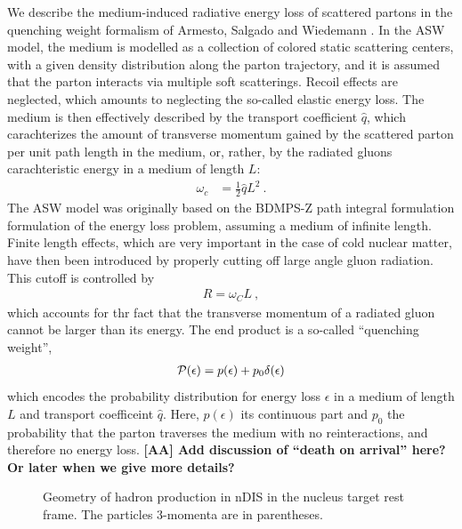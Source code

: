 We describe the medium-induced radiative energy loss of scattered partons in the quenching weight formalism of Armesto, Salgado and Wiedemann \cite{Salgado:2002cd,Salgado:2003gb,Armesto:2003jh}. In the ASW model, the medium is modelled as a collection of colored static scattering centers, with a given density distribution along the parton trajectory, and it is assumed that the parton interacts via multiple soft scatterings. Recoil effects are neglected, which amounts to neglecting the so-called elastic energy loss. 
The medium is then effectively described by the transport coefficient $\hat
q$, which carachterizes the amount of transverse momentum gained by the scattered parton per unit path length in the medium, or, rather, by the radiated gluons carachteristic energy in a medium of length $L$:
\begin{align}
  \omega_c & = \frac12 \hat q L^2 \ .
\end{align}
The ASW model was originally based on the BDMPS-Z path integral formulation formulation of the energy loss problem, assuming a medium of infinite length. Finite length effects, which are very important in the case of cold nuclear matter, have then been introduced by properly cutting off large angle gluon radiation. This cutoff is controlled by
\begin{align}
  R = \omega_C L \ ,   
\end{align}
which accounts for thr fact that the transverse momentum of a radiated gluon cannot be larger than its energy. The end product is a so-called ``quenching weight'', 
\begin{align}
  {\mathcal P}(\epsilon) = p(\epsilon) + p_0 \delta(\epsilon) 
\end{align}
which encodes the probability distribution for energy loss $\epsilon$ in a medium of length $L$ and transport coefficeint $\hat q$. Here, $p(\epsilon)$ its continuous part and $p_0$ the probability that the parton traverses the medium with no reinteractions, and therefore no energy loss. {\bf [AA] Add discussion of ``death on arrival'' here? Or later when we give more details?}

\begin{figure}[tbp]
  \centering
  \caption{Geometry of hadron production in nDIS in the nucleus 
    target rest frame. The particles 3-momenta are in parentheses.}
  \label{fig:DISgeom}
\end{figure}

